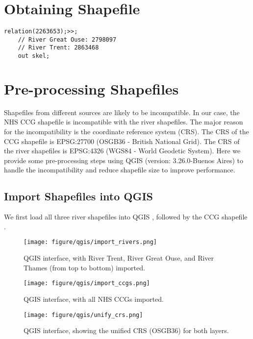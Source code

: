 \appendix

\let\origappendixsection=\section
\renewcommand\section[1]{\origappendixsection{\textbf{#1}}}

\section{Obtaining Shapefile}
\label{obtaining-shapefile}
\begin{lstlisting}[caption={The query that downloads the shapefile of River Thames from OpenStreetMap via the Overpass Turbo API.}, label={overpass},captionpos=b]
    relation(2263653);>>;
    // River Great Ouse: 2798097
    // River Trent: 2863468
    out skel;
\end{lstlisting}
\section{Pre-processing Shapefiles}
\label{app:pre-processing}
Shapefiles from different sources are likely to be incompatible. In our case, the NHS CCG shapefile is incompatible with the river shapefiles. The major reason for the incompatibility is the coordinate reference system (CRS). The CRS of the CCG shapefile is EPSG:27700 (OSGB36 - British National Grid). The CRS of the river shapefiles is EPSG:4326 (WGS84 - World Geodetic System). Here we provide some pre-processing steps using QGIS (version: 3.26.0-Buenos Aires) \cite{qgisWelcome} to handle the incompatibility and reduce shapefile size to improve performance.

\subsection{Import Shapefiles into QGIS}
We first load all three river shapefiles into QGIS , followed by the CCG shapefile .

{
\begin{figure}[H]
    \centering
    \texttt{[image: figure/qgis/import\_rivers.png]}
    \caption{QGIS interface, with River Trent, River Great Ouse, and River Thames (from top to bottom) imported.}
    \label{fig:import_rivers}
\end{figure}

\begin{figure}[H]
    \centering
    \texttt{[image: figure/qgis/import\_ccgs.png]}
    \caption{QGIS interface, with all NHS CCGs imported.}
    \label{fig:import_ccgs}
\end{figure}

\begin{figure}[H]
    \centering
    \texttt{[image: figure/qgis/unify\_crs.png]}
    \caption{QGIS interface, showing the unified CRS (OSGB36) for both layers.}
    \label{fig:unify_crs}
\end{figure}
}

